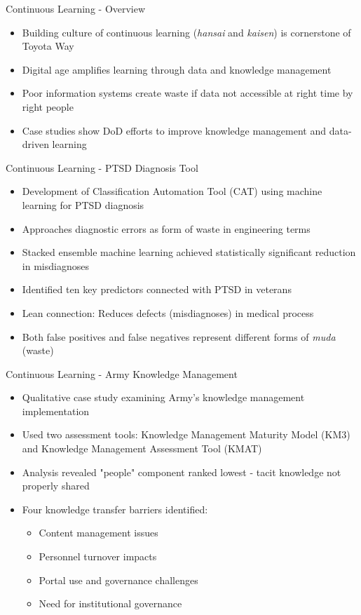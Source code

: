 \documentclass[aspectratio=169,11pt,xcolor={dvipsnames},hyperref={pdftex,pdfpagemode=UseNone,hidelinks,pdfdisplaydoctitle=true},usepdftitle=false]{beamer}
\begin{document}
  \begin{frame}{Continuous Learning - Overview}
    \begin{itemize}
      \item Building culture of continuous learning (\textit{hansai} and \textit{kaisen}) is cornerstone of Toyota Way
      \item Digital age amplifies learning through data and knowledge management
      \item Poor information systems create waste if data not accessible at right time by right people
      \item Case studies show DoD efforts to improve knowledge management and data-driven learning
    \end{itemize}
  \end{frame}

  \begin{frame}{Continuous Learning - PTSD Diagnosis Tool \cite{Le2023}}
    \begin{itemize}
      \item Development of Classification Automation Tool (CAT) using machine learning for PTSD diagnosis
      \item Approaches diagnostic errors as form of waste in engineering terms
      \item Stacked ensemble machine learning achieved statistically significant reduction in misdiagnoses
      \item Identified ten key predictors connected with PTSD in veterans
      \item Lean connection: Reduces defects (misdiagnoses) in medical process
      \item Both false positives and false negatives represent different forms of \textit{muda} (waste)
    \end{itemize}
  \end{frame}

  \begin{frame}{Continuous Learning - Army Knowledge Management \cite{VanLaar2023}}
    \begin{itemize}
      \item Qualitative case study examining Army's knowledge management implementation
      \item Used two assessment tools: Knowledge Management Maturity Model (KM3) and Knowledge Management Assessment Tool (KMAT)
      \item Analysis revealed "people" component ranked lowest - tacit knowledge not properly shared
      \item Four knowledge transfer barriers identified:
        \begin{itemize}
          \item Content management issues
          \item Personnel turnover impacts
          \item Portal use and governance challenges
          \item Need for institutional governance
        \end{itemize}
    \end{itemize}
  \end{frame}
\end{document}
